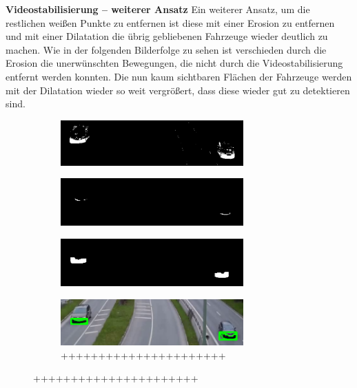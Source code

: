 \documentclass[conference]{IEEEtran}
\begin{document}
	\textbf{Videostabilisierung – weiterer Ansatz}
	Ein weiterer Ansatz, um die restlichen weißen Punkte zu entfernen ist diese mit einer Erosion zu entfernen und mit einer Dilatation die übrig gebliebenen Fahrzeuge wieder deutlich zu machen.
	Wie in der folgenden Bilderfolge zu sehen ist verschieden durch die Erosion die unerwünschten Bewegungen, die nicht durch die Videostabilisierung entfernt werden konnten. Die nun kaum sichtbaren Flächen der Fahrzeuge werden mit der Dilatation wieder so weit vergrößert, dass diese wieder gut zu detektieren sind.\\
	\begin{figure}
		\begin{subfigure}{}
			\centering\includegraphics[width=7cm]{Media/MOG1.png}
		\end{subfigure}
		\vspace{5pt}
		\begin{subfigure}{}
			\centering\includegraphics[width=7cm]{Media/MOG2.png}
		\end{subfigure}
		\vspace{5pt}
		\begin{subfigure}{}
			\centering\includegraphics[width=7cm]{Media/MOG3.png}
		\end{subfigure}
		\vspace{5pt}
		\begin{subfigure}{}
			\centering\includegraphics[width=7cm]{Media/MOG4.png}
			\caption{++++++++++++++++++++++}
		\end{subfigure}
	\end{figure}
	
	
\end{document}
